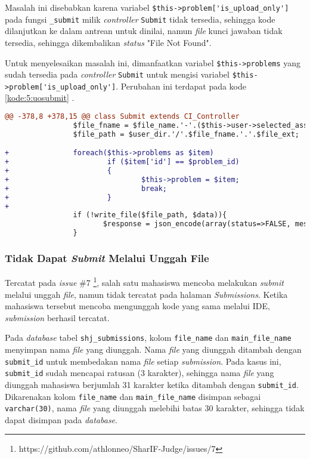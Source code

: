 Masalah ini disebabkan karena variabel \verb|$this->problem['is_upload_only']| pada fungsi \verb|_submit| milik \textit{controller} \verb|Submit| tidak tersedia, sehingga kode dilanjutkan ke dalam antrean untuk dinilai, namun \textit{file} kunci jawaban tidak tersedia, sehingga dikembalikan \textit{status} "File Not Found".

Untuk menyelesaikan masalah ini, dimanfaatkan variabel \verb|$this->problems| yang sudah tersedia pada \textit{controller} \verb|Submit| untuk mengisi variabel \verb|$this->problem['is_upload_only']|. Perubahan ini terdapat pada kode \ref{kode:5:uosubmit} .

\begin{lstlisting}[language=diff, caption=Perubahan pada \texttt{Submit.php}, label=kode:5:uosubmit]
@@ -378,8 +378,15 @@ class Submit extends CI_Controller
                $file_fname = $file_name.'-'.($this->user->selected_assignment['total_submits']+1);
                $file_path = $user_dir.'/'.$file_fname.'.'.$file_ext;

+               foreach($this->problems as $item)
+                       if ($item['id'] == $problem_id)
+                       {
+                               $this->problem = $item;
+                               break;
+                       }
+
                if (!write_file($file_path, $data)){
                       $response = json_encode(array(status=>FALSE, message=>'Unable to submit'));
                }
\end{lstlisting}

\subsubsection{Tidak Dapat \textit{Submit} Melalui Unggah File}
Tercatat pada \textit{issue} \#7 \footnote{https://github.com/athlonneo/SharIF-Judge/issues/7}, salah satu mahasiswa mencoba melakukan \textit{submit} melalui unggah \textit{file}, namun tidak tercatat pada halaman \textit{Submissions}. Ketika mahasiswa tersebut mencoba mengunggah kode yang sama melalui IDE, \textit{submission} berhasil tercatat. 

Pada \textit{database} tabel \verb|shj_submissions|, kolom \verb|file_name| dan \verb|main_file_name| menyimpan nama \textit{file} yang diunggah. Nama \textit{file} yang diunggah ditambah dengan \verb|submit_id| untuk membedakan nama \textit{file} setiap \textit{submission}. Pada kasus ini, \verb|submit_id| sudah mencapai ratusan (3 karakter), sehingga nama \textit{file} yang diunggah mahasiswa berjumlah 31 karakter ketika ditambah dengan \verb|submit_id|. Dikarenakan kolom \verb|file_name| dan \verb|main_file_name| disimpan sebagai \verb|varchar(30)|, nama \textit{file} yang diunggah melebihi batas 30 karakter, sehingga tidak dapat disimpan pada \textit{database}.

